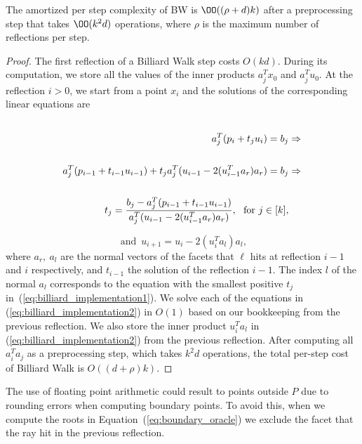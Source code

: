    \begin{lem}
   \label{lem:BW-step-cost}
   The amortized per step complexity of BW is $\OO((\rho + d)k)$ after a preprocessing step that takes $\OO(k^2d)$ operations, where $\rho$ is the maximum number of reflections per step.
   \end{lem}

   \begin{proof}
      The first reflection of a Billiard Walk step costs $O(kd)$.
      During its computation, we store all the values of the inner
      products $a_j^Tx_0$ and $a_j^Tu_0$.
      At the reflection $i>0$, we start from a point $x_i$
      and the solutions of the corresponding linear equations are
      \label{eq:billiard_implementation1}
      \begin{equation*}
      \begin{split}
         \cr a_j^T(p_i + t_ju_i) = b_j & \Rightarrow \\
         \cr a_j^T(p_{i-1} + t_{i-1}u_{i-1})
         + t_ja_j^T(u_{i-1}-2(u_{i-1}^Ta_r) a_r) = b_j  & \Rightarrow \\
         \cr t_j = \frac{b_j - a_j^T(p_{i-1} +  t_{i-1}u_{i-1})}{a_j^T(u_{i-1}-2(u_{i-1}^Ta_r) a_r)},\
         \text{ for }  j \in [k]  ,
         \end{split}
      \end{equation*}

      \begin{equation}\label{eq:billiard_implementation2}
      \text{ and } \, u_{i+1} = u_i -2(u_i^Ta_l) a_l,
      \end{equation}
      where $a_r,\ a_l$ are the normal vectors of the facets that $\ell$ hits at reflection $i-1$ and $i$ respectively, and $t_{i-1}$ the solution of the  reflection $i-1$.
      The index $l$ of the normal $a_l$
      corresponds to the equation with the smallest positive $t_j$
      in~(\ref{eq:billiard_implementation1}).
      We solve each of the  equations in (\ref{eq:billiard_implementation2}) in $O(1)$ based on our bookkeeping from the  previous reflection.
      We also store the inner product $u_i^Ta_l$ in (\ref{eq:billiard_implementation2}) from the  previous reflection.
      After computing all $a_i^Ta_j$ as a preprocessing step, which takes $k^2d$ operations, the total per-step cost of Billiard Walk is $O((d+\rho)k)$.
   \end{proof}


   The use of floating point arithmetic could result to points outside $P$ due to rounding errors when computing boundary points. 
   To avoid this, when we compute the roots in Equation~(\ref{eq:boundary_oracle}) we exclude the facet that the ray hit in the previous reflection.


